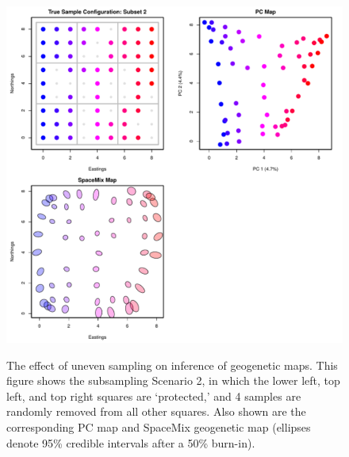 \documentclass[10pt,letterpaper]{article}
\begin{document}
\begin{figure}
\centering
	{\includegraphics[width=\textwidth]{../figs/sims/grid_subsamp2.pdf}}
	\caption{The effect of uneven sampling on inference of geogenetic maps.  
			This figure shows the subsampling Scenario 2, 
			in which the lower left, top left, and top right squares are `protected,'
			and 4 samples are randomly removed from all other squares.
			Also shown are the corresponding PC map and 
			SpaceMix geogenetic map 
			(ellipses denote 95\% credible intervals after a 50\% burn-in).}\label{sfig:uneven_sampling_grid_subsamp2}
\end{figure}
\end{document}
